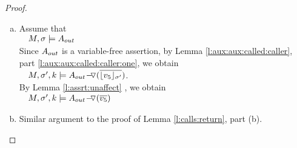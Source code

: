 \begin{proof}$ ~ $


\begin{enumerate}[a.]
\item
Assume that \\
$\strut \ \ \ M, \sigma \models  {\Aout}$\\
Since $\Aout$ is a variable-free assertion,  by   Lemma \ref{l:aux:aux:called:caller}, part \ref{l:aux:aux:called:caller:one}, we obtain\\  
$\strut \ \ \ \satDAssertFrom M  {\sigma'} k   {\PushASLong  {(\overline {\interpret {\sigma'} {v_5}})}    {\Aout}}$.\\
By Lemma \ref{l:assrt:unaffect}   ,  we obtain \\
$\strut \ \ \ \satDAssertFrom M  {\sigma'} k  {\PushASLong  {(\overline {v_5})}    {\Aout}}$
\item
Similar argument to the proof of Lemma \ref{l:calls:return}, part (b).
\end{enumerate}

\end{proof}


